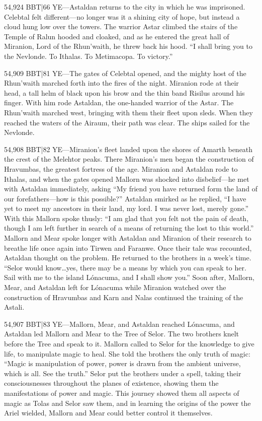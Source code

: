 \documentclass[smalldemyvopaper,11pt,twoside,onecolumn,openright,extrafontsizes]{memoir}
\begin{document}
{{54,924 BBT|66 YE—Astaldan returns to the city in which he was imprisoned. Celebtal felt different—no longer was it a shining city of hope, but instead a cloud hung low over the towers. The warrior Astar climbed the stairs of the Temple of Ralun hooded and cloaked, and as he entered the great hall of Miranion, Lord of the Rhun’waith, he threw back his hood.
“I shall bring you to the Nevlonde. To Ithalas. To Metimacopa. To victory.”

54,909 BBT|81 YE—The gates of Celebtal opened, and the mighty host of the Rhun’waith marched forth into the fires of the night. Miranion rode at their head, a tall helm of black upon his brow and the thin band Risilus around his finger. With him rode Astaldan, the one-handed warrior of the Astar. The Rhun’waith marched west, bringing with them their fleet upon sleds. When they reached the waters of the Airaum, their path was clear. The ships sailed for the Nevlonde.

54,908 BBT|82 YE—Miranion’s fleet landed upon the shores of Amarth beneath the crest of the Melehtor peaks. There Miranion’s men began the construction of Hravumbas, the greatest fortress of the age. Miranion and Astaldan rode to Ithalas, and when the gates opened Mallorn was shocked into disbelief—he met with Astaldan immediately, asking “My friend you have returned form the land of our forefathers—how is this possible?”
	Astaldan smirked as he replied, “I have yet to meet my ancestors in their land, my lord. I was never lost, merely gone.” With this Mallorn spoke thusly:
	“I am glad that you felt not the pain of death, though I am left further in search of a means of returning the lost to this world.” Mallorn and Mear spoke longer with Astaldan and Miranion of their research to breathe life once again into Tirwen and Faranwe. Once their tale was recounted, Astaldan thought on the problem. He returned to the brothers in a week’s time. “Selor would know…yes, there may be a means by which you can speak to her. Sail with me to the island Lónacuma, and I shall show you.”
	Soon after, Mallorn, Mear, and Astaldan left for Lónacuma while Miranion watched over the construction of Hravumbas and Karn and Nalas continued the training of the Astali.

54,907 BBT|83 YE—Mallorn, Mear, and Astaldan reached Lónacuma, and Astaldan led Mallorn and Mear to the Tree of Selor. The two brothers knelt before the Tree and speak to it. Mallorn called to Selor for the knowledge to give life, to manipulate magic to heal. She told the brothers the only truth of magic:
“Magic is manipulation of power, power is drawn from the ambient universe, which is all. See the truth.”
Selor put the brothers under a spell, taking their consciousnesses throughout the planes of existence, showing them the manifestations of power and magic. This journey showed them all aspects of magic as Tolas and Selor saw them, and in learning the origins of the power the Ariel wielded, Mallorn and Mear could better control it themselves.

}}
\end{document}
